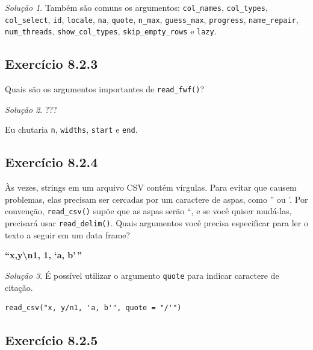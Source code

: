 \documentclass[
]{latex/krantz}
\theoremstyle{definition}
\theoremstyle{definition}
\theoremstyle{definition}
\theoremstyle{definition}
\theoremstyle{remark}
\newtheorem*{solution}{Solução}
\begin{document}
\begin{solution}
Também são comuns os argumentos: \texttt{col\_names}, \texttt{col\_types}, \texttt{col\_select}, \texttt{id}, \texttt{locale}, \texttt{na}, \texttt{quote}, \texttt{n\_max}, \texttt{guess\_max}, \texttt{progress}, \texttt{name\_repair}, \texttt{num\_threads}, \texttt{show\_col\_types}, \texttt{skip\_empty\_rows} e \texttt{lazy}.
\end{solution}

\hypertarget{exr8-2-3}{%
\subsection*{Exercício 8.2.3}\label{exr8-2-3}}

Quais são os argumentos importantes de \texttt{read\_fwf()}?

\begin{solution}
???

Eu chutaria \texttt{n}, \texttt{widths}, \texttt{start} e \texttt{end}.
\end{solution}

\hypertarget{exr8-2-4}{%
\subsection*{Exercício 8.2.4}\label{exr8-2-4}}

Às vezes, strings em um arquivo CSV contém vírgulas. Para evitar que causem problemas, elas precisam ser cercadas por um caractere de aspas, como '' ou '. Por convenção, \texttt{read\_csv()} supõe que as aspas serão ``, e se você quiser mudá-las, precisará usar \texttt{read\_delim()}. Quais argumentos você precisa especificar para ler o texto a seguir em um data frame?

\textbf{``x,y\textbackslash n1, 1, `a, b'\,''}

\begin{solution}

É possível utilizar o argumento \texttt{quote} para indicar caractere de citação.

\begin{verbatim}
read_csv("x, y/n1, 'a, b'", quote = "/'")
\end{verbatim}

\end{solution}

\hypertarget{exr8-2-5}{%
\subsection*{Exercício 8.2.5}\label{exr8-2-5}}
\end{document}
